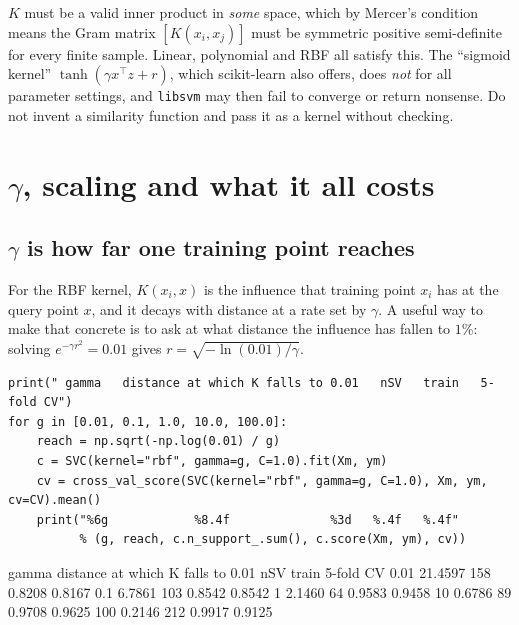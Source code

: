 \documentclass[11pt]{article}
\begin{document}
\begin{caution}
$K$ must be a valid inner product in \emph{some} space, which by Mercer's
condition means the Gram matrix $[K(x_i,x_j)]$ must be symmetric positive
semi-definite for every finite sample. Linear, polynomial and RBF all satisfy
this. The ``sigmoid kernel'' $\tanh(\gamma x^\top z + r)$, which scikit-learn
also offers, does \emph{not} for all parameter settings, and \texttt{libsvm}
may then fail to converge or return nonsense. Do not invent a similarity
function and pass it as a kernel without checking.
\end{caution}

\section{$\gamma$, scaling and what it all costs}
\label{sec:gamma}

\subsection{$\gamma$ is how far one training point reaches}

For the RBF kernel, $K(x_i, x)$ is the influence that training point $x_i$ has
at the query point $x$, and it decays with distance at a rate set by $\gamma$.
A useful way to make that concrete is to ask at what distance the influence has
fallen to $1\%$: solving $e^{-\gamma r^2} = 0.01$ gives
$r = \sqrt{-\ln(0.01)/\gamma}$.

\begin{lstlisting}
print(" gamma   distance at which K falls to 0.01   nSV   train   5-fold CV")
for g in [0.01, 0.1, 1.0, 10.0, 100.0]:
    reach = np.sqrt(-np.log(0.01) / g)
    c = SVC(kernel="rbf", gamma=g, C=1.0).fit(Xm, ym)
    cv = cross_val_score(SVC(kernel="rbf", gamma=g, C=1.0), Xm, ym, cv=CV).mean()
    print("%6g            %8.4f              %3d   %.4f   %.4f"
          % (g, reach, c.n_support_.sum(), c.score(Xm, ym), cv))
\end{lstlisting}
\begin{codeout}
 gamma   distance at which K falls to 0.01   nSV   train   5-fold CV
  0.01             21.4597              158   0.8208   0.8167
   0.1              6.7861              103   0.8542   0.8542
     1              2.1460               64   0.9583   0.9458
    10              0.6786               89   0.9708   0.9625
   100              0.2146              212   0.9917   0.9125
\end{codeout}
\end{document}
